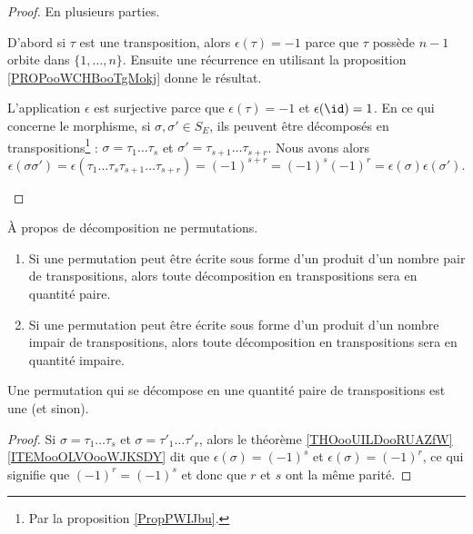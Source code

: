 \begin{proof}
	En plusieurs parties.
	\begin{subproof}
		D'abord si \( \tau\) est une transposition, alors \( \epsilon(\tau)=-1\) parce que \( \tau \) possède \( n-1\) orbite dans \( \{ 1,\ldots,n \}\). Ensuite une récurrence en utilisant la proposition \ref{PROPooWCHBooTgMokj} donne le résultat.


		L'application \( \epsilon\) est surjective parce que \(\epsilon(\tau)=-1 \) et \( \epsilon(\id)=1\). En ce qui concerne le morphisme, si \( \sigma,\sigma'\in S_E\), ils peuvent être décomposés en transpositions\footnote{Par la proposition \ref{PropPWIJbu}.} : \( \sigma=\tau_1\ldots\tau_s\) et \( \sigma'=\tau_{s+1}\ldots \tau_{s+r}\). Nous avons alors
		\begin{equation}
			\epsilon(\sigma\sigma')=\epsilon(\tau_1\ldots\tau_s\tau_{s+1}\ldots \tau_{s+r})=(-1)^{s+r}=(-1)^s(-1)^r=\epsilon(\sigma)\epsilon(\sigma').
		\end{equation}
	\end{subproof}
\end{proof}

\begin{propositionDef}\label{PROPooKRHEooAxtmRv}
	À propos de décomposition ne permutations.
	\begin{enumerate}
		\item
		      Si une permutation peut être écrite sous forme d'un produit d'un nombre pair de transpositions, alors toute décomposition en transpositions sera en quantité paire.
		\item
		      Si une permutation peut être écrite sous forme d'un produit d'un nombre impair de transpositions, alors toute décomposition en transpositions sera en quantité impaire.
	\end{enumerate}
	Une permutation qui se décompose en une quantité paire de transpositions est une  (et  sinon).
\end{propositionDef}

\begin{proof}
	Si \( \sigma=\tau_1\ldots \tau_s\) et \( \sigma=\tau'_1\ldots \tau'_r\), alors le théorème \ref{THOooUILDooRUAZfW}\ref{ITEMooOLVOooWJKSDY} dit que \( \epsilon(\sigma)=(-1)^s\) et \( \epsilon(\sigma)=(-1)^r\), ce qui signifie que \( (-1)^r=(-1)^s\) et donc que \( r\) et \( s\) ont la même parité.
\end{proof}

